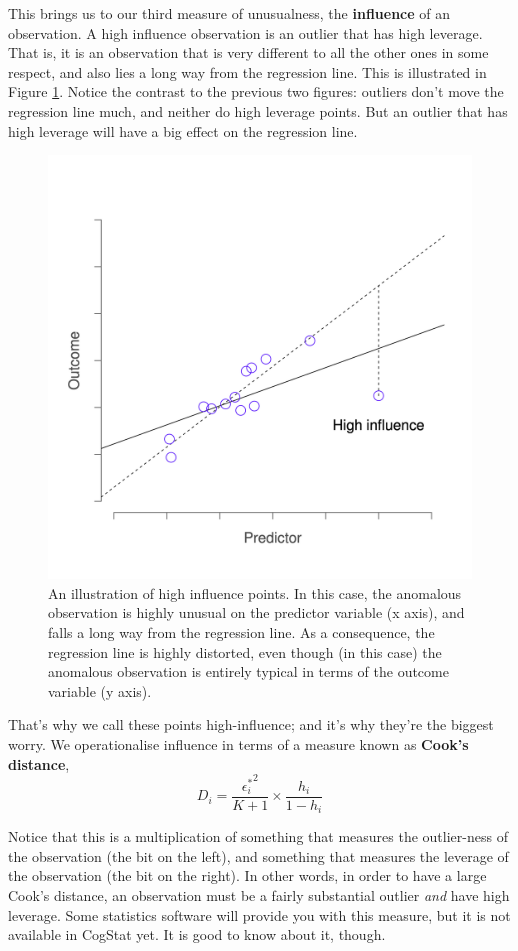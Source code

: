 \documentclass[
]{book}
\theoremstyle{definition}
\theoremstyle{definition}
\theoremstyle{definition}
\theoremstyle{definition}
\theoremstyle{remark}
\begin{document}
This brings us to our third measure of unusualness, the \textbf{influence} of an observation. A high influence observation is an outlier that has high leverage. That is, it is an observation that is very different to all the other ones in some respect, and also lies a long way from the regression line. This is illustrated in Figure \ref{fig:influence}. Notice the contrast to the previous two figures: outliers don't move the regression line much, and neither do high leverage points. But an outlier that has high leverage will have a big effect on the regression line.

\begin{figure}

{\centering \includegraphics[width=0.66\linewidth]{resources/image/unusual_influence} 

}

\caption{An illustration of high influence points. In this case, the anomalous observation is highly unusual on the predictor variable (x axis), and falls a long way from the regression line. As a consequence, the regression line is highly distorted, even though (in this case) the anomalous observation is entirely typical in terms of the outcome variable (y axis).}\label{fig:influence}
\end{figure}

That's why we call these points high-influence; and it's why they're the biggest worry. We operationalise influence in terms of a measure known as \textbf{Cook's distance},
\[
D_i = \frac{{\epsilon_i^*}^2 }{K+1} \times \frac{h_i}{1-h_i}
\]

Notice that this is a multiplication of something that measures the outlier-ness of the observation (the bit on the left), and something that measures the leverage of the observation (the bit on the right). In other words, in order to have a large Cook's distance, an observation must be a fairly substantial outlier \emph{and} have high leverage. Some statistics software will provide you with this measure, but it is not available in CogStat yet. It is good to know about it, though.
\end{document}
